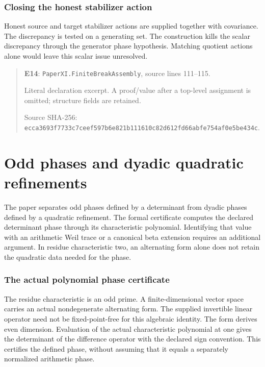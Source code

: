 \documentclass[10pt,oneside]{book}
\begin{document}

\subsection{Closing the honest stabilizer action}
\label{guide:E14}
Honest source and target stabilizer actions are supplied together with covariance. The discrepancy is tested on a generating set.
The construction kills the scalar discrepancy through the generator phase hypothesis. Matching quotient actions alone would leave this scalar issue unresolved.

\begin{quote}\footnotesize\textbf{E14}: \nolinkurl{PaperXI.FiniteBreakAssembly}, source lines 111--115.\par Literal declaration excerpt. A proof/value after a top-level assignment is omitted; structure fields are retained.\par Source SHA-256: {\scriptsize\texttt{ecca3693f7733c7ceef597b6e821b111610c82d612fd66abfe754af0e5be434c}}.\end{quote}


\chapter{Odd phases and dyadic quadratic refinements}
The paper separates odd phases defined by a determinant from dyadic phases defined by a quadratic refinement. The formal certificate computes the declared determinant phase through its characteristic polynomial. Identifying that value with an arithmetic Weil trace or a canonical beta extension requires an additional argument. In residue characteristic two, an alternating form alone does not retain the quadratic data needed for the phase.

\subsection{The actual polynomial phase certificate}
\label{guide:E15}
The residue characteristic is an odd prime. A finite-dimensional vector space carries an actual nondegenerate alternating form. The supplied invertible linear operator need not be fixed-point-free for this algebraic identity.
The form derives even dimension. Evaluation of the actual characteristic polynomial at one gives the determinant of the difference operator with the declared sign convention. This certifies the defined phase, without assuming that it equals a separately normalized arithmetic phase.
\end{document}
